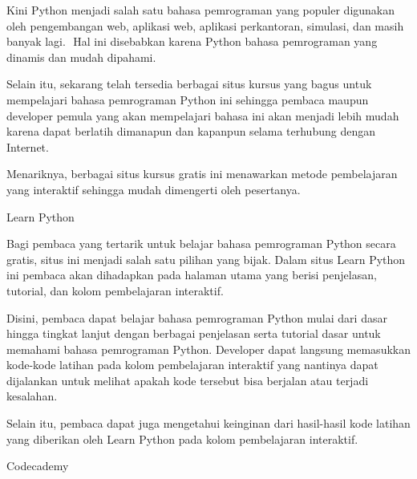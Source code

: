 \noindent 
{\fontsize{14pt}{14pt}\selectfont Kini Python menjadi salah satu bahasa pemrograman yang populer digunakan oleh pengembangan $  $web, aplikasi $  $web, aplikasi perkantoran, simulasi, dan masih banyak lagi. $  $ Hal ini disebabkan karena Python bahasa pemrograman yang dinamis dan mudah dipahami. \\} \par
\noindent 
{\fontsize{14pt}{14pt}\selectfont Selain itu, sekarang telah tersedia berbagai situs kursus yang bagus untuk mempelajari bahasa pemrograman Python ini sehingga pembaca maupun developer pemula yang akan mempelajari bahasa ini akan menjadi lebih mudah karena dapat berlatih dimanapun dan kapanpun selama terhubung dengan Internet. \\} \par
\noindent 
{\fontsize{14pt}{14pt}\selectfont Menariknya, berbagai situs kursus gratis ini menawarkan metode pembelajaran yang interaktif sehingga mudah dimengerti oleh pesertanya. \\} \par
\vspace{14pt}
\noindent 
{\fontsize{14pt}{14pt}\selectfont Learn Python \\} \par
\noindent 
{\fontsize{14pt}{14pt}\selectfont Bagi pembaca yang tertarik untuk belajar bahasa pemrograman Python secara gratis, situs ini menjadi salah satu pilihan yang bijak. Dalam situs Learn Python ini pembaca akan dihadapkan pada halaman utama yang berisi penjelasan, tutorial, dan kolom pembelajaran interaktif. \\} \par
\noindent 
{\fontsize{14pt}{14pt}\selectfont Disini, pembaca dapat belajar bahasa pemrograman Python mulai dari dasar hingga tingkat lanjut dengan berbagai penjelasan serta tutorial dasar untuk memahami bahasa pemrograman Python. Developer dapat langsung memasukkan kode-kode latihan pada kolom pembelajaran interaktif yang nantinya dapat dijalankan untuk melihat apakah kode tersebut bisa berjalan atau terjadi kesalahan. \\} \par
\noindent 
{\fontsize{14pt}{14pt}\selectfont Selain itu, pembaca dapat juga mengetahui keinginan dari hasil-hasil kode latihan yang diberikan oleh Learn Python pada kolom pembelajaran interaktif. \\} \par
\vspace{14pt}
\noindent 
{\fontsize{14pt}{14pt}\selectfont Codecademy \\} \par
